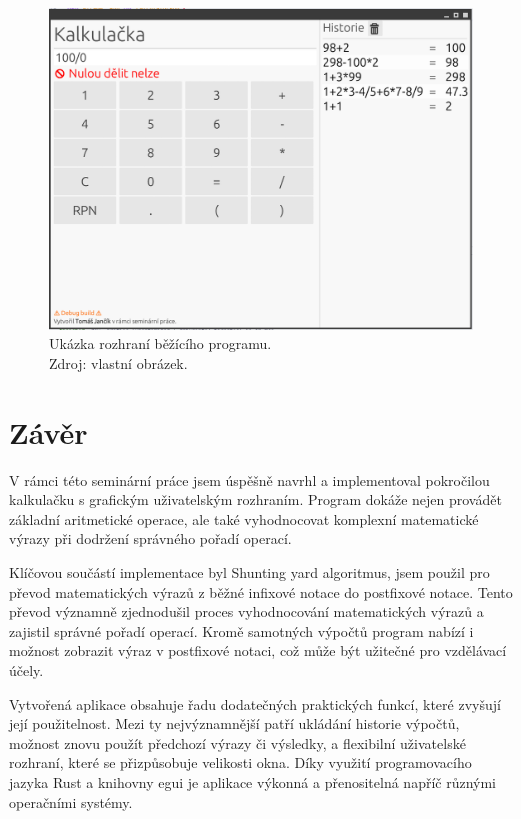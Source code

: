 \documentclass[12pt]{report}
\begin{document}
\begin{figure}
    \centering
    \includegraphics[width=1\linewidth]{Screenshot From 2025-01-02 12-01-35.png}
    \caption[Ukázka rozhraní běžícího programu]{Ukázka rozhraní běžícího programu. \\
    Zdroj: vlastní obrázek.}
    \label{fig:enter-label}
\end{figure}

\chapter{Závěr}

V rámci této seminární práce jsem úspěšně navrhl a implementoval pokročilou kalkulačku s grafickým uživatelským rozhraním. Program dokáže nejen provádět základní aritmetické operace, ale také vyhodnocovat komplexní matematické výrazy při dodržení správného pořadí operací.

Klíčovou součástí implementace byl Shunting yard algoritmus, jsem použil pro převod matematických výrazů z běžné infixové notace do postfixové notace. Tento převod významně zjednodušil proces vyhodnocování matematických výrazů a zajistil správné pořadí operací. Kromě samotných výpočtů program nabízí i možnost zobrazit výraz v postfixové notaci, což může být užitečné pro vzdělávací účely.

Vytvořená aplikace obsahuje řadu dodatečných praktických funkcí, které zvyšují její použitelnost. Mezi ty nejvýznamnější patří ukládání historie výpočtů, možnost znovu použít předchozí výrazy či výsledky, a flexibilní uživatelské rozhraní, které se přizpůsobuje velikosti okna. Díky využití programovacího jazyka Rust a knihovny egui je aplikace výkonná a přenositelná napříč různými operačními systémy.
\end{document}
